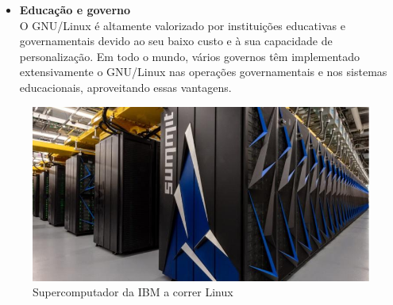 \begin{itemize}
    \item \textbf{Educação e governo}\\
    O GNU/Linux é altamente valorizado por instituições educativas e governamentais devido ao seu baixo custo e à sua capacidade de personalização. Em todo o mundo, vários governos têm implementado extensivamente o GNU/Linux nas operações governamentais e nos sistemas educacionais, aproveitando essas vantagens.
\end{itemize}

\par \vspace{6pt}

\begin{figure}[H]
    \centering
    \includegraphics[scale=0.4]{Figures/0. General/super_computer.jpg}
    \caption{Supercomputador da IBM a correr Linux}
    \label{Supercomputador da IBM a correr Linux}
\end{figure}